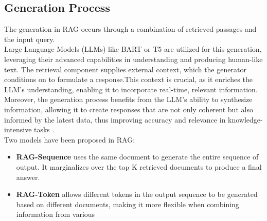 \subsection{Generation Process}
The generation in RAG occurs through a combination of retrieved passages and the input query.\\
Large Language Models (LLMs) like BART or T5 are utilized for this generation, leveraging their advanced capabilities in understanding and producing human-like text. The retrieval component supplies external context, which the generator conditions on to formulate a response.This context is crucial, as it enriches the LLM's understanding, enabling it to incorporate real-time, relevant information. Moreover, the generation process benefits from the LLM's ability to synthesize information, allowing it to create responses that are not only coherent but also informed by the latest data, thus improving accuracy and relevance in knowledge-intensive tasks \cite{lewis2020retrieval}. \\
Two models have been proposed in RAG:
\begin{itemize}
	\item \textbf{RAG-Sequence} uses the same document to generate the entire sequence of output. It marginalizes over the top K retrieved documents to produce a final answer.
	\item \textbf{RAG-Token} allows different tokens in the output sequence to be generated based on different documents, making it more flexible when combining information from various
\end{itemize}
